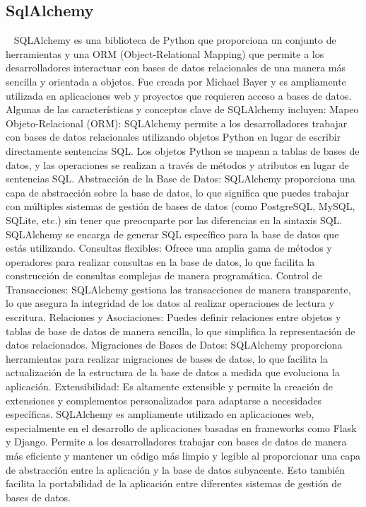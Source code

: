 \subsection{SqlAlchemy}~\cite{bayer2012sqlalchemy}
SQLAlchemy es una biblioteca de Python que proporciona un conjunto de herramientas y una ORM (Object-Relational Mapping) que permite a los desarrolladores interactuar con bases de datos relacionales de una manera más sencilla y orientada a objetos. Fue creada por Michael Bayer y es ampliamente utilizada en aplicaciones web y proyectos que requieren acceso a bases de datos.
Algunas de las características y conceptos clave de SQLAlchemy incluyen:
Mapeo Objeto-Relacional (ORM): SQLAlchemy permite a los desarrolladores trabajar con bases de datos relacionales utilizando objetos Python en lugar de escribir directamente sentencias SQL. Los objetos Python se mapean a tablas de bases de datos, y las operaciones se realizan a través de métodos y atributos en lugar de sentencias SQL.
Abstracción de la Base de Datos: SQLAlchemy proporciona una capa de abstracción sobre la base de datos, lo que significa que puedes trabajar con múltiples sistemas de gestión de bases de datos (como PostgreSQL, MySQL, SQLite, etc.) sin tener que preocuparte por las diferencias en la sintaxis SQL. SQLAlchemy se encarga de generar SQL específico para la base de datos que estás utilizando.
Consultas flexibles: Ofrece una amplia gama de métodos y operadores para realizar consultas en la base de datos, lo que facilita la construcción de consultas complejas de manera programática.
Control de Transacciones: SQLAlchemy gestiona las transacciones de manera transparente, lo que asegura la integridad de los datos al realizar operaciones de lectura y escritura.
Relaciones y Asociaciones: Puedes definir relaciones entre objetos y tablas de base de datos de manera sencilla, lo que simplifica la representación de datos relacionados.
Migraciones de Bases de Datos: SQLAlchemy proporciona herramientas para realizar migraciones de bases de datos, lo que facilita la actualización de la estructura de la base de datos a medida que evoluciona la aplicación.
Extensibilidad: Es altamente extensible y permite la creación de extensiones y complementos personalizados para adaptarse a necesidades específicas.
SQLAlchemy es ampliamente utilizado en aplicaciones web, especialmente en el desarrollo de aplicaciones basadas en frameworks como Flask y Django. Permite a los desarrolladores trabajar con bases de datos de manera más eficiente y mantener un código más limpio y legible al proporcionar una capa de abstracción entre la aplicación y la base de datos subyacente. Esto también facilita la portabilidad de la aplicación entre diferentes sistemas de gestión de bases de datos.

